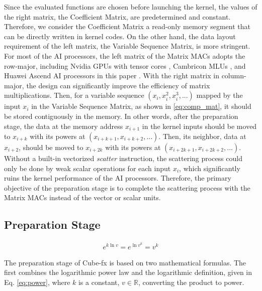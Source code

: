 Since the evaluated functions are chosen before launching the kernel, the values of the right matrix, the Coefficient Matrix, are predetermined and constant. Therefore, we consider the Coefficient Matrix a read-only memory segment that can be directly written in kernel codes. On the other hand, the data layout requirement of the left matrix, the Variable Sequence Matrix, is more stringent. For most of the AI processors, the left matrix of the Matrix MACs adopts the row-major, including Nvidia GPUs with tensor cores \cite{DBLP:conf/ipps/00020C20}, Cambricon MLUs \cite{cambricon}, and Huawei Ascend AI processors in this paper \cite{DBLP:conf/hotchips/LiaoTXZ19}. With the right matrix in column-major, the design can significantly improve the efficiency of matrix multiplications. Then, for a variable sequence $(x_{i}, x_{i}^2,  x_{i}^3, ...)$ mapped by the input $x_{i}$ in the Variable Sequence Matrix, as shown in \ref{eq:comp_mat}, it should be stored contiguously in the memory. In other words, after the preparation stage, the data at the memory address $x_{i + 1}$ in the kernel inputs should be moved to $x_{i + k}$ with its powers at $(x_{i + k + 1}, x_{i + k + 2}, ...)$. Then, its neighbor, data at $x_{i + 2}$, should be moved to $x_{i + 2k}$ with its powers at $(x_{i + 2k + 1}, x_{i + 2k + 2}, ...)$. Without a built-in vectorized \textit{scatter} instruction, the scattering process could only be done by weak scalar operations for each input $x_{i}$, which significantly ruins the kernel performance of the AI processors. Therefore, the primary objective of the preparation stage is to complete the scattering process with the Matrix MACs instead of the vector or scalar units.

\subsection{Preparation Stage}

\begin{equation}
    \label{eq:power}
    \begin{aligned}
        e^{k \ln v} = e^{\ln v^k} = v^k
    \end{aligned}
    \end{equation}

The preparation stage of Cube-fx is based on two mathematical formulas. The first combines the logarithmic power law and the logarithmic definition, given in Eq. \ref{eq:power}, where $k$ is a constant, $v \in \mathbb{R}$, converting the product to power.

